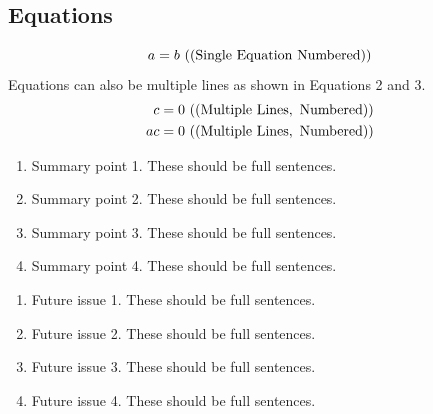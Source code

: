 \documentclass{ar-1col}
\begin{document}
\subsection{Equations}
\begin{equation}
a = b \ {\rm ((Single\ Equation\ Numbered))}
\end{equation}
Equations can also be multiple lines as shown in Equations 2 and 3.
\begin{eqnarray}
c = 0 \ {\rm ((Multiple\  Lines, \ Numbered))}\\
ac = 0 \ {\rm ((Multiple \ Lines, \ Numbered))}
\end{eqnarray}

\begin{summary}
\begin{enumerate}
\item Summary point 1. These should be full sentences.
\item Summary point 2. These should be full sentences.
\item Summary point 3. These should be full sentences.
\item Summary point 4. These should be full sentences.
\end{enumerate}
\end{summary}

\begin{issues}
\begin{enumerate}
\item Future issue 1. These should be full sentences.
\item Future issue 2. These should be full sentences.
\item Future issue 3. These should be full sentences.
\item Future issue 4. These should be full sentences.
\end{enumerate}
\end{issues}

\newpage


 

\clearpage



    
\end{document}
